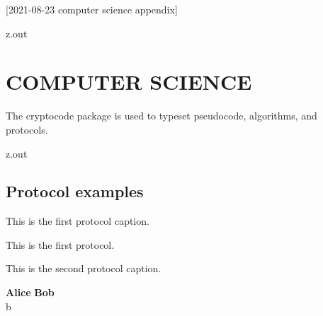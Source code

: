 [2021-08-23 computer science appendix]

\begin{VerbatimOut}{z.out}
\chapter{COMPUTER SCIENCE}

The cryptocode package \cite{mittelbach2020}
is used to typeset pseudocode,
algorithms,
and protocols.
\end{VerbatimOut}

\MyIO


\begin{VerbatimOut}{z.out}


\section{Protocol examples}

\begin{protocol}[ht]
  \caption{This is the first protocol caption.}
  This is the first protocol.
\end{protocol}

\begin{protocol}[ht]
  \caption{This is the second protocol caption.}
  \pseudocodeblock
  {
    \textbf{Alice} \> \> \textbf{Bob}\\
    b \sample \bin \> \>\\
    \>  \> \\
    \> \> 
  }
\end{protocol}
\end{VerbatimOut}

\MyIO
